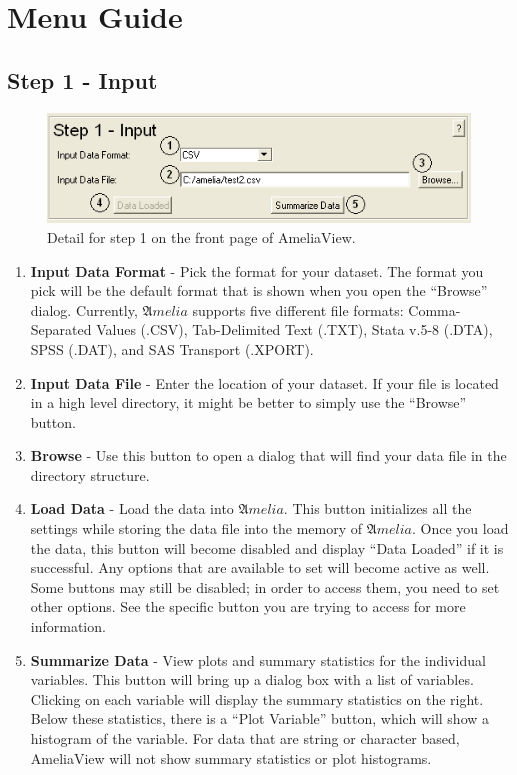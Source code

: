 \documentclass[12pt,titlepage]{article}
\begin{document}
\section{Menu Guide}
\label{sec:menu}

\subsection{Step 1 - Input}
\label{sec:step1}
\begin{figure}[ht]
  \centering \includegraphics[scale=.75]{step1.png}
  \caption{Detail for step 1 on the front page of AmeliaView.}
\end{figure}
\begin{enumerate}
\item \textbf{Input Data Format} - Pick the format for your dataset.
  The format you pick will be the default format that is shown when
  you open the ``Browse'' dialog.  Currently, ${\mathfrak Amelia}$
  supports five different file formats: Comma-Separated Values (.CSV),
  Tab-Delimited Text (.TXT), Stata v.5-8 (.DTA), SPSS (.DAT), and SAS
  Transport (.XPORT).
\item \textbf{Input Data File} - Enter the location of your dataset.
  If your file is located in a high level directory, it might be
  better to simply use the ``Browse'' button.
\item \textbf{Browse} - Use this button to open a dialog that will
  find your data file in the directory structure.
\item \textbf{Load Data} - Load the data into ${\mathfrak Amelia}$.
  This button initializes all the settings while storing the data file
  into the memory of ${\mathfrak Amelia}$.  Once you load the data,
  this button will become disabled and display ``Data Loaded'' if it
  is successful.  Any options that are available to set will become
  active as well.  Some buttons may still be disabled; in order to
  access them, you need to set other options.  See the specific button
  you are trying to access for more information.
\item \textbf{Summarize Data} - View plots and summary statistics for
  the individual variables.  This button will bring up a dialog box
  with a list of variables.  Clicking on each variable will display
  the summary statistics on the right.  Below these statistics, there
  is a ``Plot Variable'' button, which will show a histogram of the
  variable.  For data that are string or character based, AmeliaView
  will not show summary statistics or plot histograms.
\end{enumerate}
\end{document}
